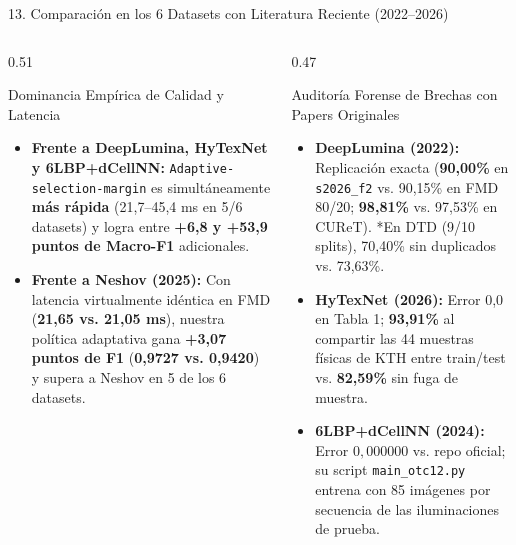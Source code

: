 \documentclass[aspectratio=169,10pt]{beamer}
\begin{document}
\begin{frame}{13. Comparación en los 6 Datasets con Literatura Reciente (2022--2026)}
\begin{columns}[T]
\begin{column}{0.51\textwidth}
\begin{exampleblock}{\scriptsize Dominancia Empírica de Calidad y Latencia}
\tiny
\begin{itemize}
\item \textbf{Frente a DeepLumina, HyTexNet y 6LBP+dCellNN:} \texttt{Adaptive-selection-margin} es simultáneamente \textbf{más rápida} (21,7--45,4 ms en 5/6 datasets) y logra entre \textbf{+6,8 y +53,9 puntos de Macro-F1} adicionales.
\item \textbf{Frente a Neshov (2025):} Con latencia virtualmente idéntica en FMD (\textbf{21,65 vs. 21,05 ms}), nuestra política adaptativa gana \textbf{+3,07 puntos de F1} (\textbf{0,9727 vs. 0,9420}) y supera a Neshov en 5 de los 6 datasets.
\end{itemize}
\end{exampleblock}
\end{column}
\begin{column}{0.47\textwidth}
\begin{alertblock}{\scriptsize Auditoría Forense de Brechas con Papers Originales}
\tiny
\begin{itemize}
\item \textbf{DeepLumina (2022):} Replicación exacta (\textbf{90,00\%} en \texttt{s2026\_f2} vs. 90,15\% en FMD 80/20; \textbf{98,81\%} vs. 97,53\% en CUReT). *En DTD (9/10 splits), 70,40\% sin duplicados vs. 73,63\%.
\item \textbf{HyTexNet (2026):} Error 0,0 en Tabla 1; \textbf{93,91\%} al compartir las 44 muestras físicas de KTH entre train/test vs. \textbf{82,59\%} sin fuga de muestra.
\item \textbf{6LBP+dCellNN (2024):} Error $0{,}000000$ vs. repo oficial; su script \texttt{main\_otc12.py} entrena con 85 imágenes por secuencia de las iluminaciones de prueba.
\end{itemize}
\end{alertblock}
\end{column}
\end{columns}
\end{frame}
\end{document}
